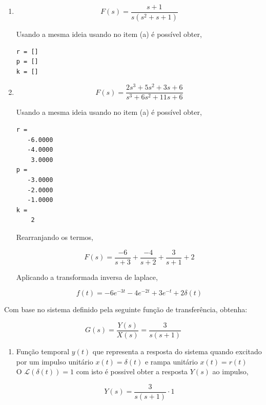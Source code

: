 \documentclass[a4paper, 10pt]{article}
\begin{document}
\begin{list}{\textbf{Questão .}}{
\setlength{\labelwidth}{-2mm} \setlength{\parsep}{0mm}
\setlength{\topsep}{0mm} \setlength{\leftmargin}{0mm}}
\begin{enumerate}
    \item

        $$
        F(s) = \frac{s+1}{s(s^2+s+1)}
        $$

        Usando a mesma ideia usando no item (a) é possível obter, 

        \begin{lstlisting}
r = []
p = []
k = []
    \end{lstlisting}


    \item

        $$
        F(s) = \frac{2 s^3 + 5 s^2 + 3 s + 6}{s^3 + 6 s^2 + 11 s + 6}
        $$

        Usando a mesma ideia usando no item (a) é possível obter, 

        \begin{lstlisting}
r = 
   -6.0000
   -4.0000
    3.0000
p = 
   -3.0000
   -2.0000
   -1.0000
k = 
    2
    \end{lstlisting}


        Rearranjando os termos, 

        $$
        F(s) = \frac{-6}{s+3} + \frac{-4}{s+2} + \frac{3}{s+1} + 2
        $$

        Aplicando a transformada inversa de laplace,

        $$
        f(t) = -6 e^{-3t} -4 e^{-2t} + 3 e^{-t} + 2 \delta(t)
        $$

    \end{enumerate}











\item 
    Com base no sistema definido pela seguinte função de transferência, obtenha:

    $$
    G(s) = \frac{Y(s)}{X(s)} = \frac{3}{s(s+1)}
    $$
    \begin{enumerate}
        \item
            Função temporal $y(t)$ que representa a resposta do sistema quando excitado
            por um impulso unitário $x(t)=\delta(t)$ e rampa unitário $x(t)=r(t)$ \\

            O $\mathcal{L}(\delta(t)) = 1$ com isto é possivel obter a resposta 
            $Y(s)$ ao impulso, 
    
            $$
                Y(s) = \frac{3}{s(s+1)} \cdot 1
            $$


\end{enumerate}
\end{list}
\end{document}
